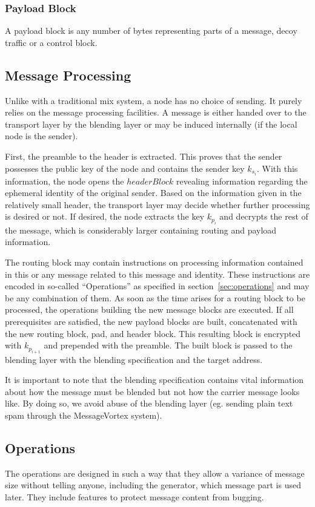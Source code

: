 \documentclass[runningheads]{llncs}
\begin{document}
\subsubsection{Payload Block}
A payload block is any number of bytes representing parts of a message, decoy traffic or a control block.

\subsection{Message Processing\label{sec:processing}}
Unlike with a traditional mix system, a node has no choice of sending. It purely relies on the message processing facilities. A message is either handed over to the transport layer by the blending layer or may be induced internally (if the local node is the sender). 

First, the preamble to the header is extracted. This proves that the sender possesses the public key of the node and contains the sender key $k_{s_i}$. With this information, the node opens the $headerBlock$ revealing information regarding the ephemeral identity of the original sender. Based on the information given in the relatively small header, the transport layer may decide whether further processing is desired or not. If desired, the node extracts the key $k_{p_i}$ and decrypts the rest of the message, which is considerably larger containing routing and payload information.

The routing block may contain instructions on processing information contained in this or any message related to this message and identity. These instructions are encoded in so-called ``Operations'' as specified in section~\ref{sec:operations} and may be any combination of them. As soon as the time arises for a routing block to be processed, the operations building the new message blocks are executed. If all prerequisites are satisfied, the new payload blocks are built, concatenated with the new routing block, pad, and header block. This resulting block is encrypted with $k_{p_{i+1}}$ and prepended with the preamble. The built block is passed to the blending layer with the blending specification and the target address.

It is important to note that the blending specification contains vital information about how the message must be blended but not how the carrier message looks like. By doing so, we avoid abuse of the blending layer (eg. sending plain text spam through the MessageVortex system).

\subsection{Operations\label{sec:operations}}
The operations are designed in such a way that they allow a variance of message size without telling anyone, including the generator, which message part is used later. They include features to protect message content from bugging.
\end{document}
